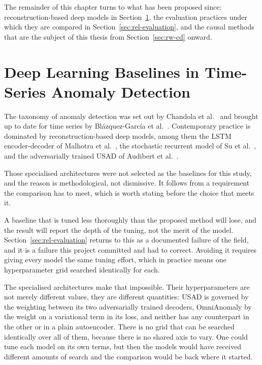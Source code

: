 The remainder of this chapter turns to what has been proposed since: reconstruction-based deep models in Section~\ref{sec:rel-neural}, the evaluation practices under which they are compared in Section~\ref{sec:rel-evaluation}, and the causal methods that are the subject of this thesis from Section~\ref{sec:rw-cd} onward.

\section{Deep Learning Baselines in Time-Series Anomaly Detection}
\label{sec:rel-neural}

The taxonomy of anomaly detection was set out by Chandola et al.~\cite{chandola2009survey} and brought up to date for time series by Bl\'azquez-Garc\'ia et al.~\cite{blazquezgarcia2021review}. Contemporary practice is dominated by reconstruction-based deep models, among them the LSTM encoder-decoder of Malhotra et al.~\cite{malhotra2016lstmad}, the stochastic recurrent model of Su et al.~\cite{su2019omnianomaly}, and the adversarially trained USAD of Audibert et al.~\cite{audibert2020usad}.

Those specialised architectures were not selected as the baselines for this study, and the reason is methodological, not dismissive. It follows from a requirement the comparison has to meet, which is worth stating before the choice that meets it.

A baseline that is tuned less thoroughly than the proposed method will lose, and the result will report the depth of the tuning, not the merit of the model. Section~\ref{sec:rel-evaluation} returns to this as a documented failure of the field, and it is a failure this project committed and had to correct. Avoiding it requires giving every model the same tuning effort, which in practice means one hyperparameter grid searched identically for each.

The specialised architectures make that impossible. Their hyperparameters are not merely different values, they are different quantities: USAD is governed by the weighting between its two adversarially trained decoders, OmniAnomaly by the weight on a variational term in its loss, and neither has any counterpart in the other or in a plain autoencoder. There is no grid that can be searched identically over all of them, because there is no shared axis to vary. One could tune each model on its own terms, but then the models would have received different amounts of search and the comparison would be back where it started.

